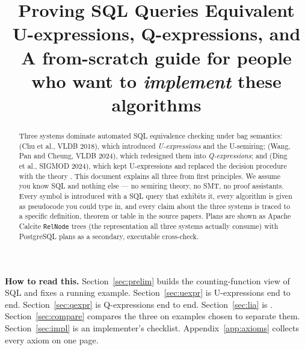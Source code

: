 \documentclass[11pt,a4paper]{article}
\title{\bfseries Proving SQL Queries Equivalent\\[4pt]
\large U-expressions, Q-expressions, and \liastar{}\\[6pt]
\normalsize A from-scratch guide for people who want to \emph{implement} these algorithms}
\author{}
\date{}
\theoremstyle{definition}
\theoremstyle{plain}
\theoremstyle{remark}
\begin{document}
\maketitle
\thispagestyle{empty}

\begin{abstract}
\noindent
Three systems dominate automated SQL equivalence checking under bag semantics:
\udp{} (Chu et al., VLDB 2018), which introduced \emph{U-expressions} and the U-semiring;
\QED{} (Wang, Pan and Cheung, VLDB 2024), which redesigned them into \emph{Q-expressions}; and
\sqlsolver{} (Ding et al., SIGMOD 2024), which kept U-expressions and replaced the
decision procedure with the theory \liastar{}.
This document explains all three from first principles. We assume you know SQL and
nothing else --- no semiring theory, no SMT, no proof assistants.
Every symbol is introduced with a SQL query that exhibits it, every algorithm is given
as pseudocode you could type in, and every claim about the three systems is traced to a
specific definition, theorem or table in the source papers.
Plans are shown as Apache Calcite \texttt{RelNode} trees (the representation all three
systems actually consume) with PostgreSQL plans as a secondary, executable cross-check.
\end{abstract}

\vspace{4pt}
\noindent\textbf{How to read this.}
Section~\ref{sec:prelim} builds the counting-function view of SQL and fixes a running
example. Section~\ref{sec:uexpr} is U-expressions end to end. Section~\ref{sec:qexpr} is
Q-expressions end to end. Section~\ref{sec:lia} is \liastar{}. Section~\ref{sec:compare}
compares the three on examples chosen to separate them. Section~\ref{sec:impl} is an
implementer's checklist. Appendix~\ref{app:axioms} collects every axiom on one page.

\tableofcontents
\newpage








\appendix

\end{document}
